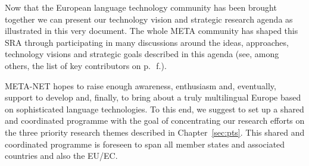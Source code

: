 \documentclass[10pt, plain]{../../metanetpaper}
\begin{document}
\begin{multicols}{2}
Now that the European language technology community has been brought together we can present our technology vision and strategic research agenda as illustrated in this very document. The whole META community has shaped this SRA through participating in many discussions around the ideas, approaches, technology visions and strategic goals described in this agenda (see, among others, the list of key contributors on p.~\pageref{sec:list-of-contributors}\,f.). 

META-NET hopes to raise enough awareness, enthusiasm and, eventually, support to develop and, finally, to bring about a truly multilingual Europe based on sophisticated language technologies. To this end, we suggest to set up a shared and coordinated programme with the goal of concentrating our research efforts on the three priority research themes described in Chapter~\ref{sec:pts}. This shared and coordinated programme is foreseen to span all member states and associated countries and also the EU/EC. 
\end{multicols}

\clearpage


\label{sec:lt2020}
\end{document}
